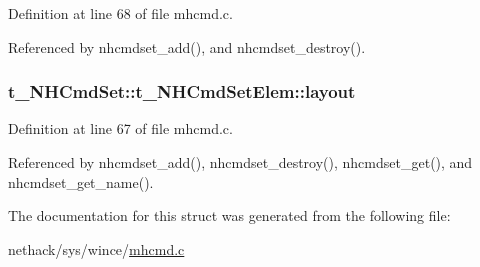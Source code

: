 Definition at line 68 of file mhcmd.\+c.



Referenced by nhcmdset\+\_\+add(), and nhcmdset\+\_\+destroy().

\hypertarget{structt__NHCmdSet_1_1t__NHCmdSetElem_aea1a472ac29d2338226972e53b82a463}{
\subsubsection[{layout}]{ t\+\_\+\+N\+H\+Cmd\+Set\+::t\+\_\+\+N\+H\+Cmd\+Set\+Elem\+::layout}}\label{structt__NHCmdSet_1_1t__NHCmdSetElem_aea1a472ac29d2338226972e53b82a463}


Definition at line 67 of file mhcmd.\+c.



Referenced by nhcmdset\+\_\+add(), nhcmdset\+\_\+destroy(), nhcmdset\+\_\+get(), and nhcmdset\+\_\+get\+\_\+name().



The documentation for this struct was generated from the following file\+:\begin{DoxyCompactItemize}
\item 
nethack/sys/wince/\hyperlink{mhcmd_8c}{mhcmd.\+c}\end{DoxyCompactItemize}
